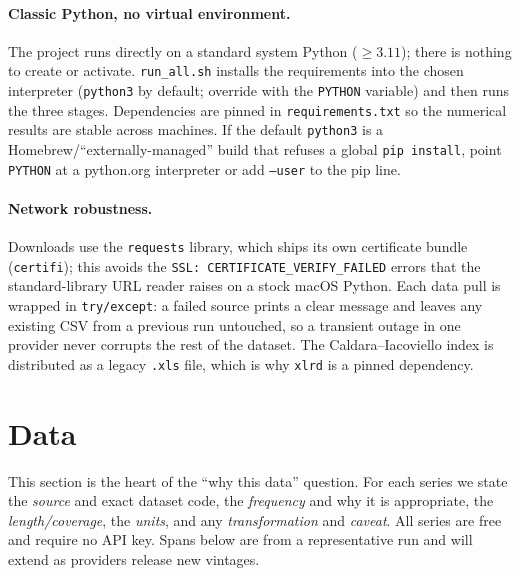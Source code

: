 \documentclass[11pt,a4paper]{article}
\newcommand{\code}[1]{\texttt{#1}}
\begin{document}
\paragraph{Classic Python, no virtual environment.} The project runs directly on
a standard system Python ($\ge 3.11$); there is nothing to create or activate.
\code{run\_all.sh} installs the requirements into the chosen interpreter
(\code{python3} by default; override with the \code{PYTHON} variable) and then
runs the three stages. Dependencies are pinned in \code{requirements.txt} so the
numerical results are stable across machines. If the default \code{python3} is a
Homebrew/``externally-managed'' build that refuses a global \code{pip install},
point \code{PYTHON} at a python.org interpreter or add \code{--user} to the pip
line.

\paragraph{Network robustness.} Downloads use the \code{requests} library, which
ships its own certificate bundle (\code{certifi}); this avoids the
\code{SSL: CERTIFICATE\_VERIFY\_FAILED} errors that the standard-library URL
reader raises on a stock macOS Python. Each data pull is wrapped in
\code{try/except}: a failed source prints a clear message and leaves any existing
CSV from a previous run untouched, so a transient outage in one provider never
corrupts the rest of the dataset. The Caldara--Iacoviello index is distributed
as a legacy \code{.xls} file, which is why \code{xlrd} is a pinned dependency.

\section{Data}\label{sec:data}

This section is the heart of the ``why this data'' question. For each series we
state the \emph{source} and exact dataset code, the \emph{frequency} and why it
is appropriate, the \emph{length/coverage}, the \emph{units}, and any
\emph{transformation} and \emph{caveat}. All series are free and require no API
key. Spans below are from a representative run and will extend as providers
release new vintages.

\end{document}
